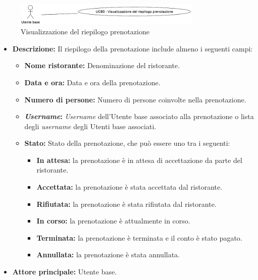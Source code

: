 \label{usecase:Visualizzazione del riepilogo prenotazione}

\begin{figure}[h]
	\centering
	\includegraphics[width=0.8\textwidth]{./uml/UCB5.png} 
	\caption{Visualizzazione del riepilogo prenotazione}
	\label{fig:UCB5}
  \end{figure}

\begin{itemize}
	\item \textbf{Descrizione:}
	Il riepilogo della prenotazione include almeno i seguenti campi:
	\begin{itemize}
		\item \textbf{Nome ristorante:} Denominazione del ristorante.
		\item \textbf{Data e ora:} Data e ora della prenotazione.
		\item \textbf{Numero di persone:} Numero di persone coinvolte nella prenotazione.
		\item \textbf{\textit{Username}:} \textit{Username} dell'Utente base associato alla prenotazione o lista degli \textit{username} degli Utenti base associati.

		\item \textbf{Stato:} Stato della prenotazione, che può essere uno tra i seguenti:
			  \begin{itemize}
				  \item \textbf{In attesa:} la prenotazione è in attesa di accettazione da parte del ristorante.
				  \item \textbf{Accettata:} la prenotazione è stata accettata dal ristorante.
				  \item \textbf{Rifiutata:} la prenotazione è stata rifiutata dal ristorante.
				  \item \textbf{In corso:} la prenotazione è attualmente in corso.
				  \item \textbf{Terminata:} la prenotazione è terminata e il conto è stato pagato.
				  \item \textbf{Annullata:} la prenotazione è stata annullata.
			  \end{itemize}
	\end{itemize}
	
	\item \textbf{Attore principale:} Utente base.


\end{itemize}
